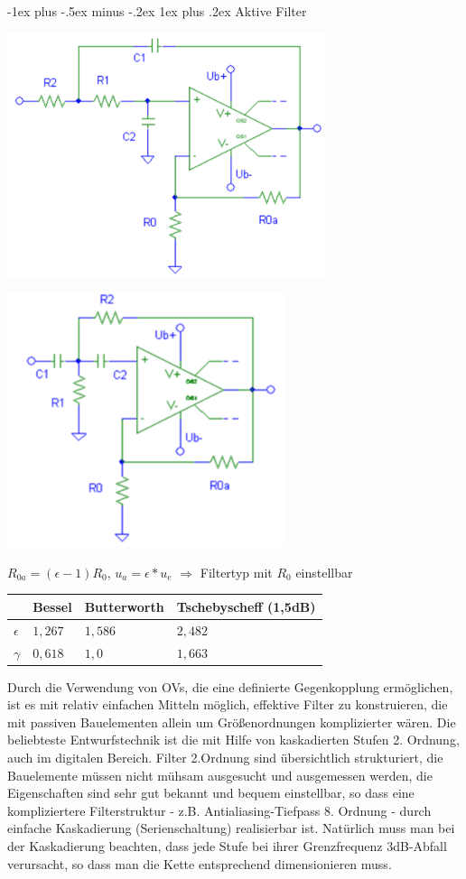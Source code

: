 \documentclass[a4paper]{article}
\makeatletter
\renewcommand{\subsubsection}{\@startsection{subsubsection}{3}{0mm}%
 {-1ex plus -.5ex minus -.2ex}%
 {1ex plus .2ex}%
 {\normalfont\small\bfseries}}
\makeatother
\begin{document}
\begin{multicols}{3}
  \subsubsection{Aktive Filter}\label{aktive-filter}

  \begin{itemize*}
    \item \includegraphics[width=.5\linewidth]{Assets/Biosignalverarbeitung-tiefpass-2.ordnung.png}
    \item \includegraphics[width=.5\linewidth]{Assets/Biosignalverarbeitung-hochpass-2.ordnung.png}
    \item $R_{0a}=(\epsilon-1)R_0$, $u_a=\epsilon*u_e$ $\Rightarrow$ Filtertyp mit $R_0$ einstellbar
    \begin{tabular}{l|l|l|l}
                 & Bessel  & Butterworth & Tschebyscheff (1,5dB) \\\hline
      $\epsilon$ & $1,267$ & $1,586$     & $2,482$               \\
      $\gamma$   & $0,618$ & $1,0$       & $1,663$
    \end{tabular}
    \item Durch die Verwendung von OVs, die eine definierte Gegenkopplung ermöglichen, ist es mit relativ einfachen Mitteln möglich, effektive Filter zu konstruieren, die mit passiven Bauelementen allein um Größenordnungen komplizierter wären. Die beliebteste Entwurfstechnik ist die mit Hilfe von kaskadierten Stufen 2. Ordnung, auch im digitalen Bereich. Filter 2.Ordnung sind übersichtlich strukturiert, die Bauelemente müssen nicht mühsam ausgesucht und ausgemessen werden, die Eigenschaften sind sehr gut bekannt und bequem einstellbar, so dass eine kompliziertere Filterstruktur - z.B. Antialiasing-Tiefpass 8. Ordnung - durch einfache Kaskadierung (Serienschaltung) realisierbar ist. Natürlich muss man bei der Kaskadierung beachten, dass jede Stufe bei ihrer Grenzfrequenz 3dB-Abfall verursacht, so dass man die Kette entsprechend dimensionieren muss.

\end{itemize*}
\end{multicols}
\end{document}
